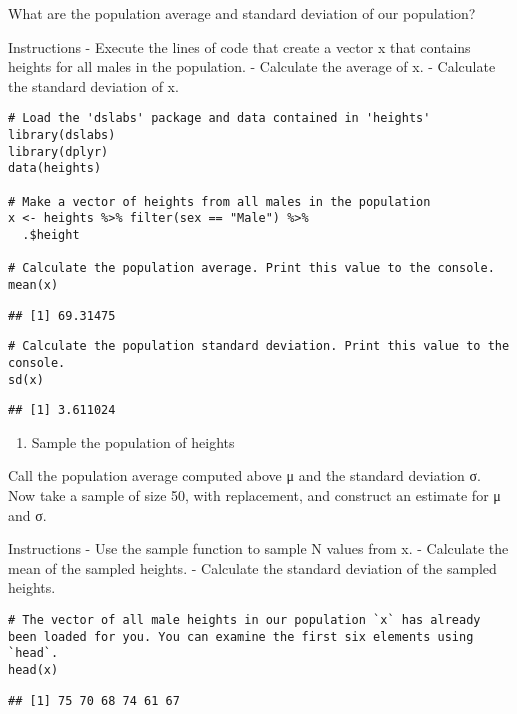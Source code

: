 \documentclass[
]{article}
\providecommand{\tightlist}{%
  \setlength{\itemsep}{0pt}\setlength{\parskip}{0pt}}
\begin{document}
What are the population average and standard deviation of our
population?

Instructions - Execute the lines of code that create a vector x that
contains heights for all males in the population. - Calculate the
average of x. - Calculate the standard deviation of x.

\begin{verbatim}
# Load the 'dslabs' package and data contained in 'heights'
library(dslabs)
library(dplyr)
data(heights)

# Make a vector of heights from all males in the population
x <- heights %>% filter(sex == "Male") %>%
  .$height

# Calculate the population average. Print this value to the console.
mean(x)
\end{verbatim}

\begin{verbatim}
## [1] 69.31475
\end{verbatim}

\begin{verbatim}
# Calculate the population standard deviation. Print this value to the console.
sd(x)
\end{verbatim}

\begin{verbatim}
## [1] 3.611024
\end{verbatim}

\begin{enumerate}
\def\labelenumi{\arabic{enumi}.}
\setcounter{enumi}{1}
\tightlist
\item
  Sample the population of heights
\end{enumerate}

Call the population average computed above μ and the standard deviation
σ. Now take a sample of size 50, with replacement, and construct an
estimate for μ and σ.

Instructions - Use the sample function to sample N values from x. -
Calculate the mean of the sampled heights. - Calculate the standard
deviation of the sampled heights.

\begin{verbatim}
# The vector of all male heights in our population `x` has already been loaded for you. You can examine the first six elements using `head`.
head(x)
\end{verbatim}

\begin{verbatim}
## [1] 75 70 68 74 61 67
\end{verbatim}
\end{document}
